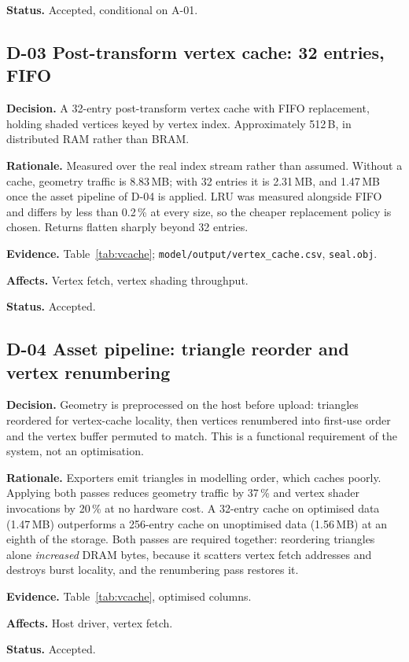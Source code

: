 \documentclass[11pt,a4paper]{article}
\newcommand{\field}[1]{\textbf{#1}\quad}
\begin{document}
\field{Status.} Accepted, conditional on A-01.

\subsection{D-03 \quad Post-transform vertex cache: 32 entries, FIFO}
\field{Decision.} A 32-entry post-transform vertex cache with FIFO replacement,
holding shaded vertices keyed by vertex index. Approximately 512\,B, in
distributed RAM rather than BRAM.

\field{Rationale.} Measured over the real index stream rather than assumed.
Without a cache, geometry traffic is 8.83\,MB; with 32 entries it is 2.31\,MB,
and 1.47\,MB once the asset pipeline of D-04 is applied. LRU was measured
alongside FIFO and differs by less than 0.2\,\% at every size, so the cheaper
replacement policy is chosen. Returns flatten sharply beyond 32 entries.

\field{Evidence.} Table~\ref{tab:vcache};
\texttt{model/output/vertex\_cache.csv}, \texttt{seal.obj}.

\field{Affects.} Vertex fetch, vertex shading throughput.

\field{Status.} Accepted.

\subsection{D-04 \quad Asset pipeline: triangle reorder and vertex renumbering}
\field{Decision.} Geometry is preprocessed on the host before upload: triangles
reordered for vertex-cache locality, then vertices renumbered into first-use
order and the vertex buffer permuted to match. This is a functional requirement
of the system, not an optimisation.

\field{Rationale.} Exporters emit triangles in modelling order, which caches
poorly. Applying both passes reduces geometry traffic by 37\,\% and vertex
shader invocations by 20\,\% at no hardware cost. A 32-entry cache on optimised
data (1.47\,MB) outperforms a 256-entry cache on unoptimised data (1.56\,MB) at
an eighth of the storage. Both passes are required together: reordering
triangles alone \emph{increased} DRAM bytes, because it scatters vertex fetch
addresses and destroys burst locality, and the renumbering pass restores it.

\field{Evidence.} Table~\ref{tab:vcache}, optimised columns.

\field{Affects.} Host driver, vertex fetch.

\field{Status.} Accepted.
\end{document}
